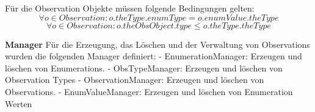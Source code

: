 Für die Observation Objekte müssen folgende Bedingungen gelten:
\begin{equation}\forall o \in Observation: o.theType.enumType = o.enumValue.theType
\end{equation}
\begin{equation}\forall o \in Observation: o.theObsObject.type \leq o.theType.theType
\end{equation}

\textbf{Manager} \newline
Für die Erzeugung, das Löschen und der Verwaltung von Observations wurden die folgenden Manager definiert:
-	EnumerationManager:
Erzeugen und löschen von Enumerations.
-	ObsTypeManager:
Erzeugen und löschen von Observation Types
-	ObservationManager:
Erzeugen und löschen von Observations.
-	EnumValueManager:
Erzeugen und löschen von Enumeration Werten

